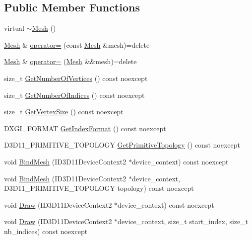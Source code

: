 \subsection*{Public Member Functions}
\begin{DoxyCompactItemize}
\item 
virtual \hyperlink{classmage_1_1_mesh_afa39b90805e434cabb0989878e335b9e}{$\sim$\+Mesh} ()
\item 
\hyperlink{classmage_1_1_mesh}{Mesh} \& \hyperlink{classmage_1_1_mesh_a5baf961af32b379671a59a082492bc5e}{operator=} (const \hyperlink{classmage_1_1_mesh}{Mesh} \&mesh)=delete
\item 
\hyperlink{classmage_1_1_mesh}{Mesh} \& \hyperlink{classmage_1_1_mesh_a28e437196db171b2df1c4bcf3df07a63}{operator=} (\hyperlink{classmage_1_1_mesh}{Mesh} \&\&mesh)=delete
\item 
size\+\_\+t \hyperlink{classmage_1_1_mesh_af2787f8893895e9a8ebec70d3062288f}{Get\+Number\+Of\+Vertices} () const noexcept
\item 
size\+\_\+t \hyperlink{classmage_1_1_mesh_a27a6ec7761ebc90995186fe1da677a70}{Get\+Number\+Of\+Indices} () const noexcept
\item 
size\+\_\+t \hyperlink{classmage_1_1_mesh_a01ea4c5a09ffc6b4babc26a4f85a673e}{Get\+Vertex\+Size} () const noexcept
\item 
D\+X\+G\+I\+\_\+\+F\+O\+R\+M\+AT \hyperlink{classmage_1_1_mesh_ad5cda42bebb42c7ade7b3efdc788d570}{Get\+Index\+Format} () const noexcept
\item 
D3\+D11\+\_\+\+P\+R\+I\+M\+I\+T\+I\+V\+E\+\_\+\+T\+O\+P\+O\+L\+O\+GY \hyperlink{classmage_1_1_mesh_af64af13acf2f372515ffdc20ce45fcb4}{Get\+Primitive\+Topology} () const noexcept
\item 
void \hyperlink{classmage_1_1_mesh_a60b8f36bbab0ae0e3dbae3b6ea013ef5}{Bind\+Mesh} (I\+D3\+D11\+Device\+Context2 $\ast$device\+\_\+context) const noexcept
\item 
void \hyperlink{classmage_1_1_mesh_ace9f6a77e326a9ec8519428a28fa7b51}{Bind\+Mesh} (I\+D3\+D11\+Device\+Context2 $\ast$device\+\_\+context, D3\+D11\+\_\+\+P\+R\+I\+M\+I\+T\+I\+V\+E\+\_\+\+T\+O\+P\+O\+L\+O\+GY topology) const noexcept
\item 
void \hyperlink{classmage_1_1_mesh_adcb8f3ca008299606db1433e330a044e}{Draw} (I\+D3\+D11\+Device\+Context2 $\ast$device\+\_\+context) const noexcept
\item 
void \hyperlink{classmage_1_1_mesh_a2f9f66bf9d6d157f6ac354047066837b}{Draw} (I\+D3\+D11\+Device\+Context2 $\ast$device\+\_\+context, size\+\_\+t start\+\_\+index, size\+\_\+t nb\+\_\+indices) const noexcept
\end{DoxyCompactItemize}
